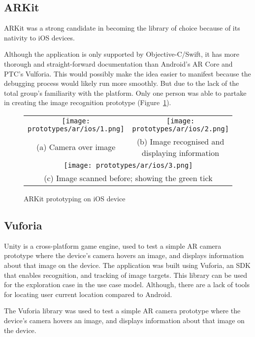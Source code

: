 \subsection{ARKit}
ARKit was a strong candidate in becoming the library of choice because of its nativity to iOS devices.

Although the application is only supported by Objective-C/Swift, it has more thorough and straight-forward documentation than Android's AR Core and PTC's Vulforia. This would possibly make the idea easier to manifest because the debugging process would likely run more smoothly. But due to the lack of the total group's familiarity with the platform. Only one person was able to partake in creating the image recognition prototype (Figure~\ref{fig:arlibrary1}). 

\begin{figure}[H]
	\centering  
	\begin{tabular}{cc}
	  \texttt{[image: prototypes/ar/ios/1.png]} &   \texttt{[image: prototypes/ar/ios/2.png]} \\
	(a) Camera over image & (b) Image recognised and displaying information \\[6pt]
	\multicolumn{2}{c}{\texttt{[image: prototypes/ar/ios/3.png]} }\\
	\multicolumn{2}{c}{(c) Image scanned before; showing the green tick}
	\end{tabular}
	\caption{ARKit prototyping on iOS device}
	\label{fig:arlibrary1}
\end{figure}

\subsection{Vuforia}
Unity is a cross-platform game engine, used to test a simple AR camera prototype where the device’s camera hovers an image, and displays information about that image on the device. The application was built using Vuforia, an SDK that enables recognition, and tracking of image targets. This library can be used for the exploration case in the use case model. Although, there are a lack of tools for locating user current location compared to Android.

The Vuforia library was used to test a simple AR camera prototype where the device’s camera hovers an image, and displays information about that image on the device.

